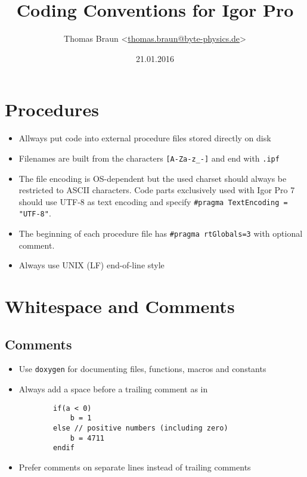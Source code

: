 \documentclass{scrartcl}
\date{21.01.2016}
\author{Thomas Braun <\url{thomas.braun@byte-physics.de}>}
\title{Coding Conventions for Igor Pro}
\begin{document}
%
\maketitle
%
\section{Procedures}
%
\begin{itemize}
	\item Allways put code into external procedure files stored directly on disk
%
	\item Filenames are built from the characters \texttt{[A-Za-z_-]} and end with \texttt{.ipf}
%
	\item The file encoding is OS-dependent but the used charset should always be restricted to ASCII characters.
		  Code parts exclusively used with Igor Pro 7 should use UTF-8 as text encoding and specify \texttt{#pragma TextEncoding = "UTF-8"}.
%
	\item The beginning of each procedure file has \texttt{#pragma rtGlobals=3} with optional comment.
%
	\item Always use UNIX (LF) end-of-line style
\end{itemize}
%
\section{Whitespace and Comments}
%
\subsection*{Comments}
%
\begin{itemize}
	\item Use \texttt{doxygen} for documenting files, functions, macros and constants
%
	\item Always add a space before a trailing comment as in
	\begin{verbatim}
		if(a < 0)
			b = 1
		else // positive numbers (including zero)
			b = 4711
		endif
	\end{verbatim}
%
	\item Prefer comments on separate lines instead of trailing comments
%
\end{itemize}
%
\end{document}
